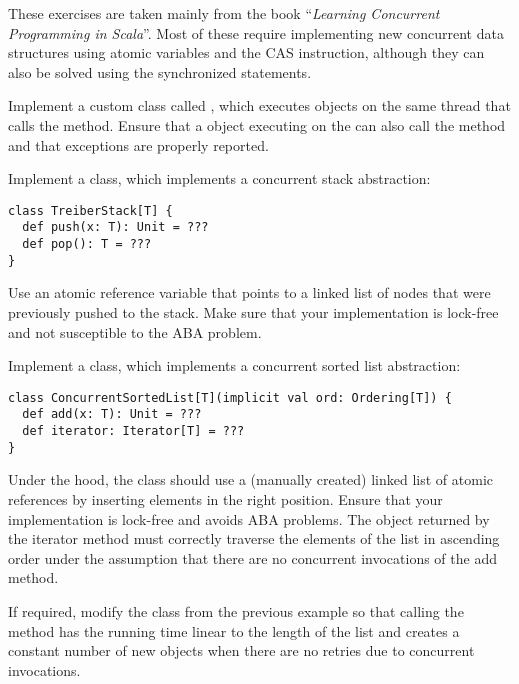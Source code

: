 \documentclass[11pt]{article}
\begin{document}
\myHeader

These exercises are taken mainly from the book ``\emph{Learning Concurrent Programming in Scala}''.
%
Most of these require implementing new concurrent data structures using atomic variables and the CAS instruction, although they can also be solved using the synchronized statements.


\begin{myExercise}
Implement a custom  class called , which executes  objects on the same thread that calls the  method. Ensure that a  object executing on the  can also call the  method and that exceptions are properly reported.
\end{myExercise}

\begin{myExercise}
Implement a  class, which implements a concurrent stack abstraction:
\begin{lstlisting}
class TreiberStack[T] {
  def push(x: T): Unit = ???
  def pop(): T = ???
}
\end{lstlisting}
Use an atomic reference variable that points to a linked list of nodes that were previously pushed to the stack. Make sure that your implementation is lock-free and not susceptible to the ABA problem.
\end{myExercise}

\begin{myExercise}
Implement a  class, which implements a concurrent sorted list abstraction:
\begin{lstlisting}
class ConcurrentSortedList[T](implicit val ord: Ordering[T]) {
  def add(x: T): Unit = ???
  def iterator: Iterator[T] = ???
}
\end{lstlisting}
Under the hood, the  class should use a (manually created) linked list of atomic references by inserting elements in the right position. Ensure that your implementation is lock-free and avoids ABA problems.
The  object returned by the iterator method must correctly traverse the elements of the list in ascending order under the assumption that there are no concurrent invocations of the add method.
\end{myExercise}

\begin{myExercise}
If required, modify the  class from the previous example so that calling the  method has the running time linear to the length of the list and creates a constant number of new objects when there are no retries due to concurrent  invocations.
\end{myExercise}
  
\end{document}
